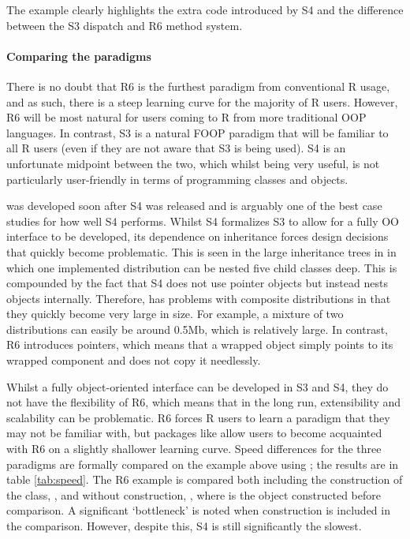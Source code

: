 The example clearly highlights the extra code introduced by S4 and the difference between the S3 dispatch and R6 method system.

\paragraph{Comparing the paradigms}
There is no doubt that R6 is the furthest paradigm from conventional R usage, and as such, there is a steep learning curve for the majority of R users. However, R6 will be most natural for users coming to R from more traditional OOP languages. In contrast, S3 is a natural FOOP paradigm that will be familiar to all R users (even if they are not aware that S3 is being used). S4 is an unfortunate midpoint between the two, which whilst being very useful, is not particularly user-friendly in terms of programming classes and objects.

 was developed soon after S4 was released and is arguably one of the best case studies for how well S4 performs. Whilst S4 formalizes S3 to allow for a fully OO interface to be developed, its dependence on inheritance forces design decisions that quickly become problematic. This is seen in the large inheritance trees in  in which one implemented distribution can be nested five child classes deep. This is compounded by the fact that S4 does not use pointer objects but instead nests objects internally. Therefore,  has problems with composite distributions in that they quickly become very large in size. For example, a mixture of two distributions can easily be around 0.5Mb, which is relatively large. In contrast, R6 introduces pointers, which means that a wrapped object simply points to its wrapped component and does not copy it needlessly.

Whilst a fully object-oriented interface can be developed in S3 and S4, they do not have the flexibility of R6, which means that in the long run, extensibility and scalability can be problematic. R6 forces R users to learn a paradigm that they may not be familiar with, but packages like  allow users to become acquainted with R6 on a slightly shallower learning curve. Speed differences for the three paradigms are formally compared on the example above using  \citep{pkgmicrobm}; the results are in table \ref{tab:speed}. The R6 example is compared both including the construction of the class, , and without construction, , where  is the object constructed before comparison. A significant `bottleneck' is noted when construction is included in the comparison. However, despite this, S4 is still significantly the slowest.

